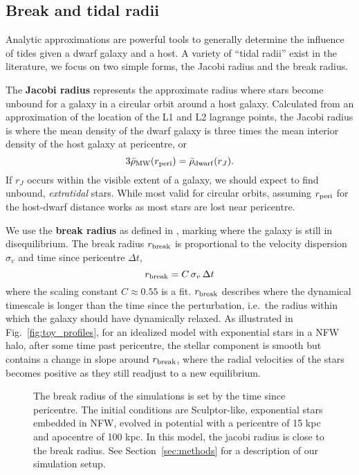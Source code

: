 \subsection{Break and tidal radii}\label{sec:break_radii}

Analytic approximations are powerful tools to generally determine the
influence of tides given a dwarf galaxy and a host. A variety of ``tidal
radii'' exist in the literature, we focus on two simple forms, the
Jacobi radius and the break radius.

The \textbf{Jacobi radius} represents the approximate radius where stars
become unbound for a galaxy in a circular orbit around a host galaxy.
Calculated from an approximation of the location of the L1 and L2
lagrange points, the Jacobi radius is where the mean density of the
dwarf galaxy is three times the mean interior density of the host galaxy
at pericentre, or \begin{equation}{
3\bar \rho_{\rm MW}(r_{\rm peri}) = \bar \rho_{\rm dwarf}(r_J).
}\end{equation} If \(r_J\) occurs within the visible extent of a galaxy,
we should expect to find unbound, \emph{extratidal} stars. While most
valid for circular orbits, assuming \(r_{\rm peri}\) for the host-dwarf
distance works as most stars are lost near pericentre.

We use the \textbf{break radius} as defined in \citet{penarrubia+2009},
marking where the galaxy is still in disequilibrium. The break radius
\(r_{\rm break}\) is proportional to the velocity dispersion
\(\sigma_v\) and time since pericentre \(\Delta t\), \begin{equation}{
r_{\rm break} = C\,\sigma_{v}\,\Delta t
}\end{equation} where the scaling constant \(C \approx 0.55\) is a fit.
\(r_{\rm break}\) describes where the dynamical timescale is longer than
the time since the perturbation, i.e.~the radius within which the galaxy
should have dynamically relaxed. As illustrated in
Fig.~\ref{fig:toy_profiles}, for an idealized model with exponential
stars in a NFW halo, after some time past pericentre, the stellar
component is smooth but contains a change in slope around
\(r_{\rm break}\), where the radial velocities of the stars becomes
positive as they still readjust to a new equilibrium.

\begin{figure}
\centering
{}
\caption[Break radius validation]{The break radius of the simulations is
set by the time since pericentre. The initial conditions are
Sculptor-like, exponential stars embedded in NFW, evolved in
\citet{EP2020} potential with a pericentre of 15 kpc and apocentre of
100 kpc. In this model, the jacobi radius is close to the break radius.
See Section~\ref{sec:methods} for a description of our simulation
setup.}\label{fig:idealized_break_radius}
\end{figure}

